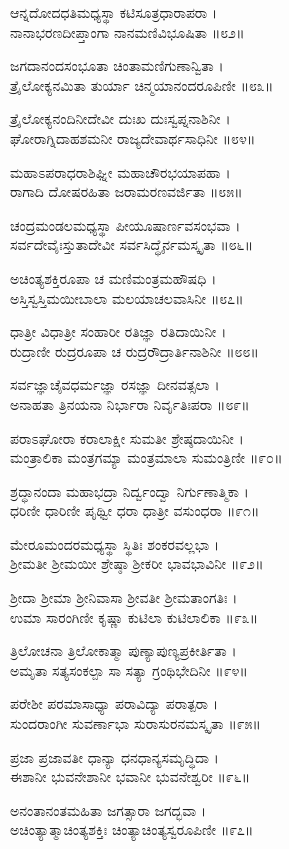 ಆನ್ನದೋದಧತಿಮಧ್ಯಸ್ಥಾ ಕಟಿಸೂತ್ರಧಾರಾಪರಾ ।\\
ನಾನಾಭರಣದೀಪ್ತಾಂಗಾ ನಾನಮಣಿವಿಭೂಷಿತಾ ॥೮೨॥

ಜಗದಾನಂದಸಂಭೂತಾ ಚಿಂತಾಮಣಿಗುಣಾನ್ವಿತಾ ।\\
ತ್ರೈಲೋಕ್ಯನಮಿತಾ ತುರ್ಯಾ ಚಿನ್ಮಯಾನಂದರೂಪಿಣೀ ॥೮೩॥

ತ್ರೈಲೋಕ್ಯನಂದಿನೀದೇವೀ ದುಃಖ ದುಃಸ್ವಪ್ನನಾಶಿನೀ ।\\
ಘೋರಾಗ್ನಿದಾಹಶಮನೀ ರಾಜ್ಯದೇವಾರ್ಥಸಾಧಿನೀ ॥೮೪॥

ಮಹಾಽಪರಾಧರಾಶಿಘ್ನೀ ಮಹಾಚೌರಭಯಾಪಹಾ ।\\
ರಾಗಾದಿ ದೋಷರಹಿತಾ ಜರಾಮರಣವರ್ಜಿತಾ ॥೮೫॥

ಚಂದ್ರಮಂಡಲಮಧ್ಯಸ್ಥಾ ಪೀಯೂಷಾರ್ಣವಸಂಭವಾ ।\\
ಸರ್ವದೇವೈಃಸ್ತುತಾದೇವೀ ಸರ್ವಸಿದ್ಧೈರ್ನಮಸ್ಕೃತಾ ॥೮೬॥

ಅಚಿಂತ್ಯಶಕ್ತಿರೂಪಾ ಚ ಮಣಿಮಂತ್ರಮಹೌಷಧಿ ।\\
ಅಸ್ತಿಸ್ವಸ್ತಿಮಯೀಬಾಲಾ ಮಲಯಾಚಲವಾಸಿನೀ ॥೮೭॥

ಧಾತ್ರೀ ವಿಧಾತ್ರೀ ಸಂಹಾರೀ ರತಿಜ್ಞಾ ರತಿದಾಯಿನೀ ।\\
ರುದ್ರಾಣೀ ರುದ್ರರೂಪಾ ಚ ರುದ್ರರೌದ್ರಾರ್ತಿನಾಶಿನೀ ॥೮೮॥

ಸರ್ವಜ್ಞಾಚೈವಧರ್ಮಜ್ಞಾ ರಸಜ್ಞಾ ದೀನವತ್ಸಲಾ ।\\
ಅನಾಹತಾ ತ್ರಿನಯನಾ ನಿರ್ಭಾರಾ ನಿರ್ವೃತಿಃಪರಾ ॥೮೯॥

ಪರಾಽಘೋರಾ ಕರಾಲಾಕ್ಷೀ ಸುಮತೀ ಶ್ರೇಷ್ಠದಾಯಿನೀ ।\\
ಮಂತ್ರಾಲಿಕಾ ಮಂತ್ರಗಮ್ಯಾ ಮಂತ್ರಮಾಲಾ ಸುಮಂತ್ರಿಣೀ ॥೯೦॥

ಶ್ರದ್ಧಾನಂದಾ ಮಹಾಭದ್ರಾ ನಿರ್ದ್ವಂದ್ವಾ ನಿರ್ಗುಣಾತ್ಮಿಕಾ ।\\
ಧರಿಣೀ ಧಾರಿಣೀ ಪೃಥ್ವೀ ಧರಾ ಧಾತ್ರೀ ವಸುಂಧರಾ ॥೯೧॥

ಮೇರೂಮಂದರಮಧ್ಯಸ್ಥಾ ಸ್ಥಿತಿಃ ಶಂಕರವಲ್ಲಭಾ ।\\
ಶ್ರೀಮತೀ ಶ್ರೀಮಯೀ ಶ್ರೇಷ್ಠಾ ಶ್ರೀಕರೀ ಭಾವಭಾವಿನೀ ॥೯೨॥

ಶ್ರೀದಾ ಶ್ರೀಮಾ ಶ್ರೀನಿವಾಸಾ ಶ್ರೀವತೀ ಶ್ರೀಮತಾಂಗತಿಃ ।\\
ಉಮಾ ಸಾರಂಗಿಣೀ ಕೃಷ್ಣಾ ಕುಟಿಲಾ ಕುಟಿಲಾಲಿಕಾ ॥೯೩॥

ತ್ರಿಲೋಚನಾ ತ್ರಿಲೋಕಾತ್ಮಾ ಪುಣ್ಯಾಪುಣ್ಯಪ್ರಕೀರ್ತಿತಾ  ।\\
ಅಮೃತಾ ಸತ್ಯಸಂಕಲ್ಪಾ ಸಾ ಸತ್ಯಾ ಗ್ರಂಥಿಭೇದಿನೀ ॥೯೪॥

ಪರೇಶೀ ಪರಮಾಸಾಧ್ಯಾ ಪರಾವಿದ್ಯಾ ಪರಾತ್ಪರಾ ।\\
ಸುಂದರಾಂಗೀ ಸುವರ್ಣಾಭಾ ಸುರಾಸುರನಮಸ್ಕೃತಾ ॥೯೫॥

ಪ್ರಜಾ ಪ್ರಜಾವತೀ ಧಾನ್ಯಾ ಧನಧಾನ್ಯಸಮೃದ್ಧಿದಾ ।\\
ಈಶಾನೀ ಭುವನೇಶಾನೀ ಭವಾನೀ ಭುವನೇಶ್ವರೀ ॥೯೬॥

ಅನಂತಾನಂತಮಹಿತಾ ಜಗತ್ಸಾರಾ ಜಗದ್ಭವಾ ।\\
ಅಚಿಂತ್ಯಾತ್ಮಾಚಿಂತ್ಯಶಕ್ತಿಃ ಚಿಂತ್ಯಾಚಿಂತ್ಯಸ್ವರೂಪಿಣೀ ॥೯೭॥

